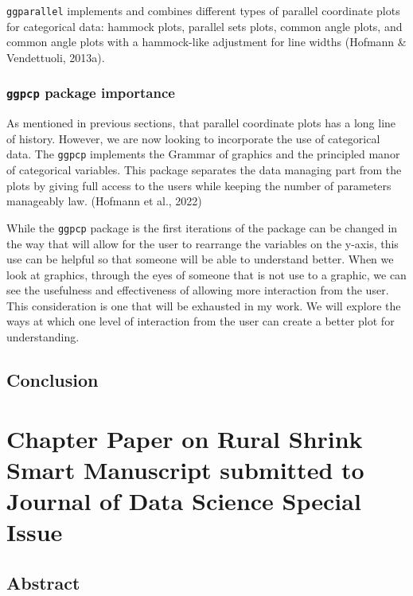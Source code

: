 \documentclass[print]{nuthesis}
\begin{document}
\texttt{ggparallel} implements and combines different types of parallel coordinate plots for categorical data: hammock plots, parallel sets plots, common angle plots, and common angle plots with a hammock-like adjustment for line widths (Hofmann \& Vendettuoli, 2013a).

\hypertarget{ggpcp-package-importance}{%
\subsection{\texorpdfstring{\texttt{ggpcp} package importance}{ggpcp package importance}}\label{ggpcp-package-importance}}

As mentioned in previous sections, that parallel coordinate plots has a long line of history. However, we are now looking to incorporate the use of categorical data. The \texttt{ggpcp} implements the Grammar of graphics and the principled manor of categorical variables. This package separates the data managing part from the plots by giving full access to the users while keeping the number of parameters manageably law. (Hofmann et al., 2022)

While the \texttt{ggpcp} package is the first iterations of the package can be changed in the way that will allow for the user to rearrange the variables on the y-axis, this use can be helpful so that someone will be able to understand better. When we look at graphics, through the eyes of someone that is not use to a graphic, we can see the usefulness and effectiveness of allowing more interaction from the user. This consideration is one that will be exhausted in my work. We will explore the ways at which one level of interaction from the user can create a better plot for understanding.

\hypertarget{conclusion}{%
\section{Conclusion}\label{conclusion}}

\hypertarget{rmd-basics}{%
\chapter{Chapter Paper on Rural Shrink Smart Manuscript submitted to Journal of Data Science Special Issue}\label{rmd-basics}}

\hypertarget{abstract}{%
\section{Abstract}\label{abstract}}
\end{document}
